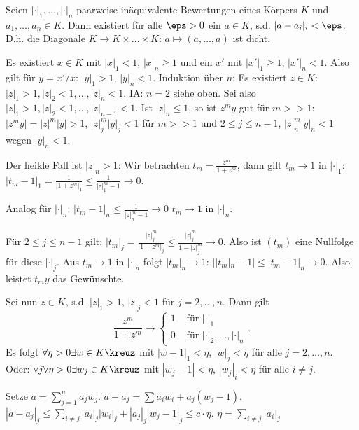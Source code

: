 \renewcommand{\lecdate}{13.01.2015}

\begin{Fakt}
 Seien $|\cdot|_1,\ldots,|\cdot|_n$ paarweise inäquivalente Bewertungen eines Körpers $K$ und $a_1,\ldots,a_n\in K$. Dann existiert für alle $\eps>0$ ein $a\in K$, s.d. $|a-a_i|_i<\eps$.
 D.h. die Diagonale $K\rightarrow K\times \ldots \times K$: $a\mapsto (a,\ldots,a)$ ist dicht.
\end{Fakt}

\begin{Beweis}
 Es existiert $x\in K$ mit $|x|_1<1$, $|x|_n\geq 1$ und ein $x'$ mit $|x'|_1\geq 1$, $|x'|_n<1$. Also gilt für $y=x'/x$: $|y|_1>1$, $|y|_n<1$. Induktion über $n$:
 Es existiert $z\in K:$ $|z|_1>1, |z|_2<1, \ldots, |z|_n<1$. IA: $n=2$ siehe oben. Sei also $|z|_1>1, |z|_2<1, \ldots, |z|_{n-1}<1$. Ist $|z|_n\leq 1$, so ist $z^my$ gut für $m>>1$:
 $|z^my|=|z|^m|y|>1$, $|z|_j^m|y|_j<1$ für $m>>1$ und $2\leq j\leq n-1$, $|z|_n^m|y|_n<1$ wegen $|y|_n<1$. 
 
 Der heikle Fall ist $|z|_n>1$: Wir betrachten $t_m=\frac{z^m}{1+z^m}$, dann gilt $t_m\rightarrow 1$ in $|\cdot|_1$: $|t_m-1|_1=\frac{1}{|1+z^m|_1}\leq \frac{1}{|z|_1^m-1}\rightarrow 0$.
 
 Analog für $|\cdot|_n$: $|t_m-1|_n\leq \frac{1}{|z|_n^m-1}\rightarrow 0$ \folge $t_m\rightarrow 1$ in $|\cdot|_n$.
 
 Für $2\leq j\leq n-1$ gilt: $|t_m|_j=\frac{|z|_j^m}{|1+z^m|_j}\leq \frac{|z|_j^m}{1-|z|_j^m}\rightarrow 0$. Also ist $(t_m)$ eine Nullfolge für diese $|\cdot|_j$. Aus $t_m\rightarrow 1$ in $|\cdot|_n$ folgt $|t_m|_n\rightarrow 1$: $||t_m|_n-1|\leq |t_m-1|_n \rightarrow 0$. Also leistet $t_my$ das Gewünschte.
 
 Sei nun $z\in K$, s.d. $|z|_1>1$, $|z|_j<1$ für $j=2,\ldots,n$. Dann gilt \[ \frac{z^m}{1+z^m}\rightarrow\begin{cases}
                                                                                                           1 & \text{ für } |\cdot|_1\\
                                                                                                           0 & \text{ für } |\cdot|_2, \ldots, |\cdot|_n
                                                                                                          \end{cases}.
\]
Es folgt $\forall \eta>0\exists w\in K\kreuz$ mit $|w-1|_1<\eta$, $|w|_j<\eta$ für alle $j=2,\ldots,n$. Oder: $\forall j\forall \eta>0\exists w_j\in K\kreuz$ mit $|w_j-1|<\eta$, $|w_j|_i<\eta$ für alle $i\neq j$.

Setze $a=\sum_{j=1}^n a_j w_j$. $a-a_j=\sum a_i w_i + a_j(w_j-1)$. \folge $|a-a_j|_j\leq \sum_{i\neq j} |a_i|_j |w_i|_j + |a_j|_j|w_j-1|_j\leq c\cdot\eta$. $\eta=\sum_{i\neq j} |a_i|_j$ 
\end{Beweis}

